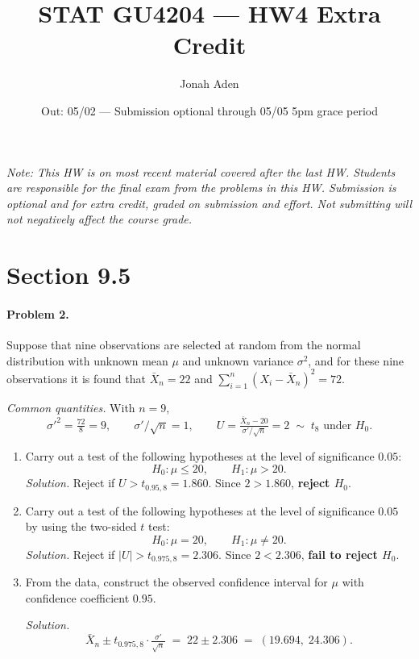 \documentclass[11pt]{article}
\title{STAT GU4204 --- HW4 Extra Credit}
\author{Jonah Aden}
\date{Out: 05/02 --- Submission optional through 05/05 5pm grace period}
\begin{document}
\maketitle

\noindent\textit{Note: This HW is on most recent material covered after the last HW.
Students are responsible for the final exam from the problems in this HW.
Submission is optional and for extra credit, graded on submission and effort.
Not submitting will not negatively affect the course grade.}

\bigskip

\section*{Section 9.5}

\paragraph{Problem 2.}
Suppose that nine observations are selected at random from the normal distribution
with unknown mean $\mu$ and unknown variance $\sigma^2$, and for these nine
observations it is found that $\bar{X}_n = 22$ and
$\sum_{i=1}^{n}(X_i - \bar{X}_n)^2 = 72$.

\textit{Common quantities.} With $n = 9$,
\[
    \sigma'^{2} = \tfrac{72}{8} = 9, \qquad
    \sigma'/\sqrt{n} = 1, \qquad
    U = \tfrac{\bar{X}_n - 20}{\sigma'/\sqrt{n}} = 2 \;\sim\; t_8 \text{ under } H_0.
\]

\begin{enumerate}[label=(\alph*)]
    \item Carry out a test of the following hypotheses at the level of significance $0.05$:
    \[
        H_0\colon \mu \leq 20, \qquad H_1\colon \mu > 20.
    \]
    \textit{Solution.} Reject if $U > t_{0.95,8} = 1.860$. Since $2 > 1.860$, \textbf{reject $H_0$}.

    \item Carry out a test of the following hypotheses at the level of significance $0.05$
    by using the two-sided $t$ test:
    \[
        H_0\colon \mu = 20, \qquad H_1\colon \mu \neq 20.
    \]
    \textit{Solution.} Reject if $|U| > t_{0.975,8} = 2.306$. Since $2 < 2.306$, \textbf{fail to reject $H_0$}.

    \item From the data, construct the observed confidence interval for $\mu$ with
    confidence coefficient $0.95$.

    \textit{Solution.}
    \[
        \bar{X}_n \pm t_{0.975,8}\cdot \tfrac{\sigma'}{\sqrt{n}}
        \;=\; 22 \pm 2.306
        \;=\; (19.694,\; 24.306).
    \]
\end{enumerate}
\end{document}
